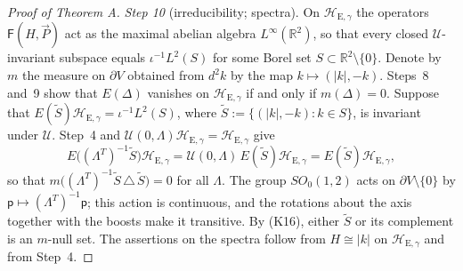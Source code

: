 \documentclass[11pt,letterpaper,reqno]{amsart}
\theoremstyle{definition}
\begin{document}
\begin{proof}[Proof of Theorem A]
\emph{Step 10} (irreducibility; spectra).
On $\mathcal H_{\mathrm E,\gamma}$ the operators $\mathsf F(H,\vec P)$ act as the maximal abelian algebra $L^\infty(\mathbb R^2)$, so that every closed $\mathcal U$-invariant subspace equals $\iota^{-1}L^2(S)$ for some Borel set $S\subset\mathbb R^2\setminus\{0\}$.
Denote by $m$ the measure on $\partial V$ obtained from $d^2k$ by the map $k\mapsto(|k|,-k)$.
Steps~8 and~9 show that $E(\Delta)$ vanishes on $\mathcal H_{\mathrm E,\gamma}$ if and only if $m(\Delta)=0$.
Suppose that $E(\tilde S)\mathcal H_{\mathrm E,\gamma}=\iota^{-1}L^2(S)$, where $\tilde S:=\{(|k|,-k):k\in S\}$, is invariant under $\mathcal U$.
Step~4 and $\mathcal U(0,\Lambda)\mathcal H_{\mathrm E,\gamma}=\mathcal H_{\mathrm E,\gamma}$ give
\begin{equation*}
E\bigl((\Lambda^T)^{-1}\tilde S\bigr)\mathcal H_{\mathrm E,\gamma}=\mathcal U(0,\Lambda)\,E(\tilde S)\mathcal H_{\mathrm E,\gamma}=E(\tilde S)\mathcal H_{\mathrm E,\gamma},
\end{equation*}
so that $m\bigl((\Lambda^T)^{-1}\tilde S\,\triangle\,\tilde S\bigr)=0$ for all $\Lambda$.
The group $SO_0(1,2)$ acts on $\partial V\setminus\{0\}$ by $\mathsf p\mapsto(\Lambda^T)^{-1}\mathsf p$;
this action is continuous, and the rotations about the axis together with the boosts make it transitive.
By (K16), either $\tilde S$ or its complement is an $m$-null set.
The assertions on the spectra follow from $H\cong|k|$ on $\mathcal H_{\mathrm E,\gamma}$ and from Step~4.


\end{proof}
\end{document}

